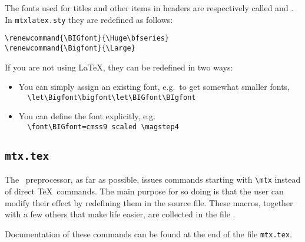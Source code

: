 \documentclass[11pt]{article}
\begin{document}
The fonts used for titles and other items in headers are respectively 
called  and .  In \verb"mtxlatex.sty"
they are redefined as follows:
\begin{verbatim}
\renewcommand{\BIGfont}{\Huge\bfseries}
\renewcommand{\Bigfont}{\Large} 
\end{verbatim}
If you are not using \LaTeX, they can be redefined in two ways:
\begin{itemize}
  \item You can simply assign an existing font, e.g.\ to get
 somewhat smaller fonts,\\
\verb"  \let\Bigfont\bigfont\let\BIGfont\BIgfont"
  \item You can define the font explicitly, e.g.\ \\
\verb"  \font\BIGfont=cmss9 scaled \magstep4"
\end{itemize}

\subsection{\Large \texttt{mtx.tex}}  \label{mtxtex}

The \MTx\ preprocessor, as far as possible, issues commands starting
with \verb"\mtx" instead of direct \TeX\ commands.  The main purpose
for so doing is that the user can modify their effect by redefining
them in the source file.  These macros, together with a few others
that make life easier, are collected in the file .

Documentation of these commands can be found at the end of the file
\texttt{mtx.tex}. 


\end{document}

